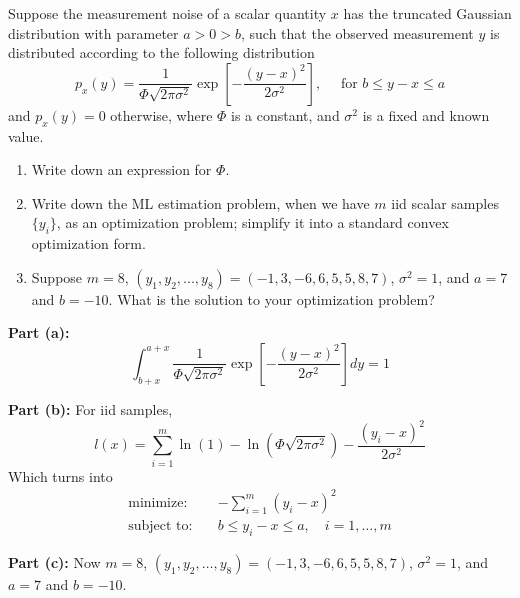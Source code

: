 \documentclass[11pt]{article}
\begin{document}
\begin{homeworkProblem}
    Suppose the measurement noise of a scalar quantity $x$ has the truncated Gaussian distribution
    with parameter $a > 0 > b$, such that the observed measurement $y$ is distributed according to
    the following distribution
    \[
        p_x(y)=\frac{1}{\Phi \sqrt{2 \pi \sigma^2}} \exp \left[-\frac{(y-x)^2}{2 \sigma^2}\right], \quad \text { for } b \leq y-x \leq a
    \]
    and $p_x(y)=0$ otherwise, where $\Phi$ is a constant, and $\sigma^2$ is a fixed and known value.
    \begin{enumerate}[label=(\alph*), topsep=5pt, itemsep=5pt]
        \item Write down an expression for $\Phi$.
        \item Write down the ML estimation problem, when we have $m$ iid scalar samples $\{y_i\}$, as an
              optimization problem; simplify it into a standard convex optimization form.
        \item Suppose $m = 8$, $(y_1, y_2, . . . , y_8) = (-1, 3,-6, 6, 5, 5, 8, 7)$, $\sigma^2 = 1$, and $a = 7$ and $b = -10$.
              What is the solution to your optimization problem? \newline
    \end{enumerate}
    \solution

    \textbf{Part (a):}
    \[
        \int_{b+x}^{a+x} \frac{1}{\Phi \sqrt{2 \pi \sigma^2}} \exp \left[-\frac{(y-x)^2}{2 \sigma^2}\right] dy = 1
    \]

    \textbf{Part (b):} For iid samples,
    \[
        l(x) = \sum_{i=1}^{m} \ln(1) - \ln(\Phi \sqrt{2 \pi \sigma^2}) - \frac{(y_i - x)^2}{2 \sigma^2}
    \]
    Which turns into
    \begin{align*}
        \text{minimize:} \quad   & - \sum_{i=1}^{m} (y_i - x)^2                  \\
        \text{subject to:} \quad & b \leq y_i - x \leq a, \quad i = 1, \ldots, m
    \end{align*}

    \textbf{Part (c):} Now $m = 8$, $(y_1, y_2, \dots, y_8) = (-1, 3,-6, 6, 5, 5, 8, 7)$, $\sigma^2 = 1$, and $a = 7$ and $b = -10$.

\end{homeworkProblem}

\pagebreak
\end{document}
